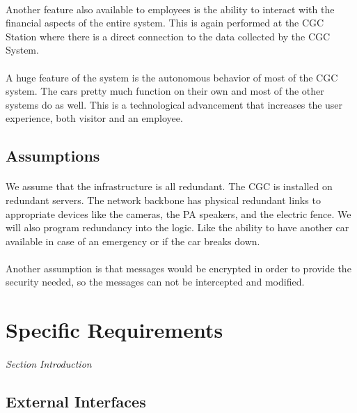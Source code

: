 \documentclass[12pt]{article}
\begin{document}
    \paragraph{} Another feature also available to employees is the ability to interact with the financial aspects of the entire system. This is again performed at the CGC Station where there is a direct connection to the data collected by the CGC System.
        
    \paragraph{} A huge feature of the system is the autonomous behavior of most of the CGC system. The cars pretty much function on their own and most of the other systems do as well. This is a technological advancement that increases the user experience, both visitor and an employee.
    

    \subsection{Assumptions}
    \paragraph{} We assume that the infrastructure is all redundant. The CGC is 
    installed on redundant servers. The network backbone has physical redundant 
    links to appropriate devices like the cameras, the PA speakers, and the 
    electric fence. We will also	program redundancy into the logic. Like the 
    ability to have another car available in case of an emergency or if the car 
    breaks down.

    \paragraph{} Another assumption is that messages would be encrypted in order 
    to provide the security needed, so the messages can not be intercepted and 
    modified.

\section{Specific Requirements} \label{spec}
\paragraph{} \textit{Section Introduction}

    \subsection{External Interfaces} \label{inter}%
\end{document}
